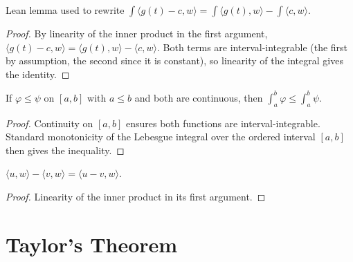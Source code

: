 \begin{lemma}\label{lem:integral_inner_sub_const}
  \leanok{}
  \uses{}
  Lean lemma used to rewrite
  $\int \langle g(t)-c,w\rangle = \int \langle g(t),w\rangle - \int\langle c,w\rangle$.
\end{lemma}
\begin{proof}
  \leanok{}
  By linearity of the inner product in the first argument, $\langle g(t)-c,w\rangle =
  \langle g(t),w\rangle - \langle c,w\rangle$. Both terms are interval-integrable (the first by
  assumption, the second since it is constant), so linearity of the integral gives the identity.
\end{proof}

\begin{lemma}\label{lem:intervalIntegral_mono_of_continuous}
  \leanok{}
  \uses{}
  If $\varphi\le\psi$ on $[a,b]$ with $a\le b$ and both are continuous, then
  $\int_a^b\varphi \le \int_a^b\psi$.
\end{lemma}
\begin{proof}
  \leanok{}
  Continuity on $[a,b]$ ensures both functions are interval-integrable. Standard monotonicity of the
  Lebesgue integral over the ordered interval $[a,b]$ then gives the inequality.
\end{proof}

\begin{lemma}\label{lem:inner_sub_left_eq}
  \leanok{}
  \uses{}
  $\langle u,w\rangle - \langle v,w\rangle = \langle u-v,w\rangle$.
\end{lemma}
\begin{proof}
  \leanok{}
  Linearity of the inner product in its first argument.
\end{proof}

\chapter{Taylor's Theorem}\label{sec:TaylorsTheorem}


